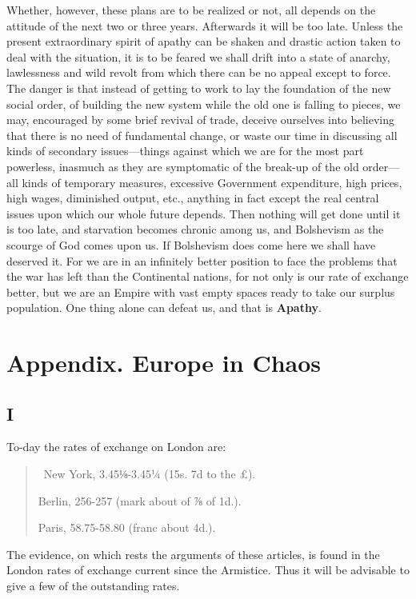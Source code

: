\documentclass{book}
\begin{document}
Whether, however, these plans are to be realized or not, all depends on the attitude of the next two or three years. Afterwards it will be too late. Unless the present extraordinary spirit of apathy can be shaken and drastic action taken to deal with the situation, it is to be feared we shall drift into a state of anarchy, lawlessness and wild revolt from which there can be no appeal except to force. The danger is that instead of getting to work to lay the foundation of the new social order, of building the new system while the old one is falling to pieces, we may, encouraged by some brief revival of trade, deceive ourselves into believing that there is no need of fundamental change, or waste our time in discussing all kinds of secondary issues—things against which we are for the most part powerless, inasmuch as they are symptomatic of the break-up of the old order—all kinds of temporary measures, excessive Government expenditure, high prices, high wages, diminished output, etc., anything in fact except the real central issues upon which our whole future depends. Then nothing will get done until it is too late, and starvation becomes chronic among us, and Bolshevism as the scourge of God comes upon us. If Bolshevism does come here we shall have deserved it. For we are in an infinitely better position to face the problems that the war has left than the Continental nations, for not only is our rate of exchange better, but we are an Empire with vast empty spaces ready to take our surplus population. One thing alone can defeat us, and that is \textbf{Apathy}.

\chapter*{Appendix. Europe in Chaos\footnotemark[1]}
\label{chapter-13}
\section*{I}
To-day the rates of exchange on London are:

\begin{quotation}\
	New York, 3.45⅛-3.45¼ (15s. 7d to the £).

	Berlin, 256-257 (mark about of ⅞ of 1d.).

	Paris, 58.75-58.80 (franc about 4d.).
\end{quotation}

The evidence, on which rests the arguments of these articles, is found in the London rates of exchange current since the Armistice. Thus it will be advisable to give a few of the outstanding rates.
\end{document}
